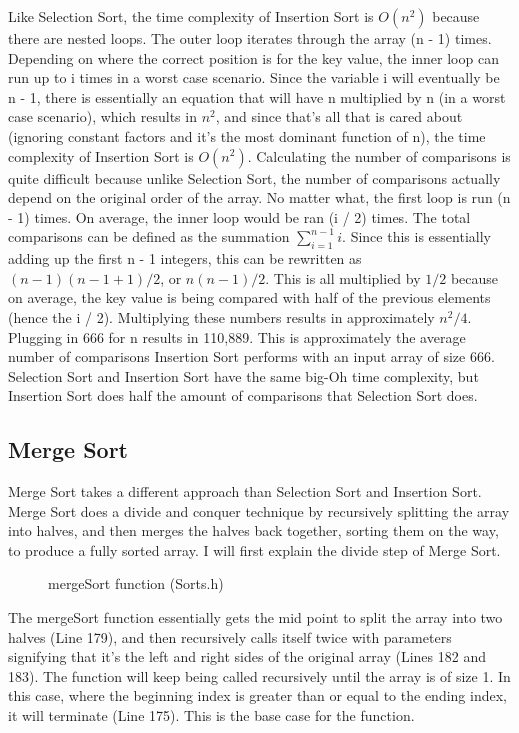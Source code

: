 \documentclass[letterpaper, 10pt]{article}
\begin{document}
\vspace{-0.5em}
\noindent
Like Selection Sort, the time complexity of Insertion Sort is $O(n^2)$ because there are nested loops. The outer loop iterates through the array (n - 1) times. Depending on where the correct position is for the key value, the inner loop can run up to i times in a worst case scenario. Since the variable i will eventually be n - 1, there is essentially an equation that will have n multiplied by n (in a worst case scenario), which results in $n^2$, and since that's all that is cared about (ignoring constant factors and it's the most dominant function of n), the time complexity of Insertion Sort is $O(n^2)$. Calculating the number of comparisons is quite difficult because unlike Selection Sort, the number of comparisons actually depend on the original order of the array. No matter what, the first loop is run (n - 1) times. On average, the inner loop would be ran (i / 2) times. The total comparisons can be defined as the summation $\sum_{i = 1}^{n-1} i$. Since this is essentially adding up the first n - 1 integers, this can be rewritten as $(n-1)(n-1+1)/2$, or $n(n-1)/2$. This is all multiplied by $1/2$ because on average, the key value is being compared with half of the previous elements (hence the i / 2). Multiplying these numbers results in approximately $n^2/4$. Plugging in 666 for n results in 110,889. This is approximately the average number of comparisons Insertion Sort performs with an input array of size 666. Selection Sort and Insertion Sort have the same big-Oh time complexity, but Insertion Sort does half the amount of comparisons that Selection Sort does.

\subsection{Merge Sort}
\noindent
Merge Sort takes a different approach than Selection Sort and Insertion Sort. Merge Sort does a divide and conquer technique by recursively splitting the array into halves, and then merges the  halves back together, sorting them on the way, to produce a fully sorted array. I will first explain the divide step of Merge Sort.
\begin{figure}[H]
  \centering
  
  \caption{mergeSort function (Sorts.h)}
  \label{fig:figure4.5}
\end{figure}
\noindent
The mergeSort function essentially gets the mid point to split the array into two halves (Line 179), and then recursively calls itself twice with parameters signifying that it's the left and right sides of the original array (Lines 182 and 183). The function will keep being called recursively until the array is of size 1. In this case, where the beginning index is greater than or equal to the ending index, it will terminate (Line 175). 
\vspace{1em}
This is the base case for the function. 
\end{document}
